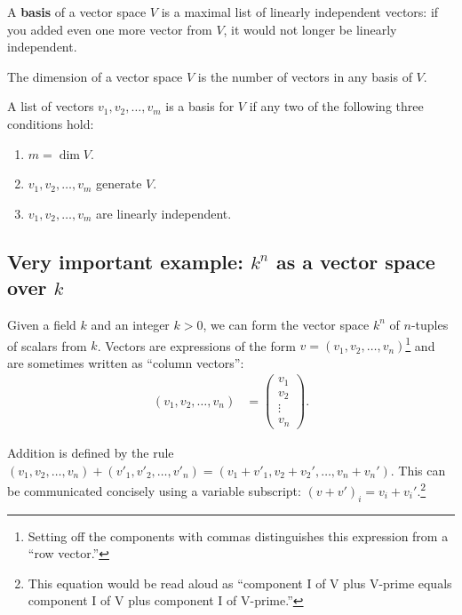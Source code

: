 \begin{definition}[Basis]
  A \textbf{basis} of a vector space \(V\) is a maximal list of linearly independent vectors: if you added even one more vector from \(V\), it would not longer be linearly independent.
\end{definition}

\begin{definition}[Dimension]
  The dimension of a vector space \(V\) is the number of vectors in any basis of \(V\).
\end{definition}

\begin{theorem}
  A list of vectors \(v_1, v_2, \ldots, v_m\) is a basis for \(V\) if any two of the following three conditions hold:
  \begin{enumerate}
    \item \(m = \dim V\).
    \item \(v_1, v_2, \ldots, v_m\) generate \(V\).
    \item \(v_1, v_2, \ldots, v_m\) are linearly independent.
  \end{enumerate}
\end{theorem}

\subsection{Very important example: \(k^n\) as a vector space over \(k\)}
Given a field \(k\) and an integer \(k > 0\), we can form the vector space \(k^n\) of \(n\)-tuples of scalars from \(k\).
Vectors are expressions of the form \(v = (v_1, v_2, \ldots, v_n) \)\footnote{Setting off the components with commas distinguishes this expression from a ``row vector.''} and are sometimes written as ``column vectors'':
\begin{align*}
  (v_1, v_2, \ldots, v_n)
  &=
  \begin{pmatrix}
    v_1 \\
    v_2 \\
    \vdots\\
    v_n
  \end{pmatrix}.
\end{align*}

Addition is defined by the rule
\((v_1, v_2, \ldots, v_n) + (v'_1, v'_2, \ldots, v'_n) = (v_1 + v'_1, v_2 + v_2', \ldots, v_n + v_n')\).
This can be communicated concisely using a variable subscript:
\((v + v')_i = v_i + v_i'\).\footnote{This equation would be read aloud as
``component I of V plus V-prime
equals component I of V plus component I of V-prime.''
}

